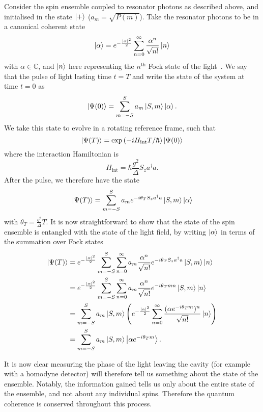 Consider the spin ensemble coupled to resonator photons as described above, and
initialised in the state $\ket{+}$ ($a_m = \sqrt{P(m)}$). Take the resonator
photons to be in a canonical coherent state~\cite{Gazeau2009}
%
\begin{equation}
  \ket{\alpha} = e^{-\frac{|\alpha|^2}{2}}\sum_{n=0}^\infty \frac{\alpha^n}{\sqrt{n!}} \ket{n}
\end{equation}
%
with $\alpha\in\mathbb{C}$, and $\ket{n}$ here representing the $n^\text{th}$
Fock state of the light~\cite{agarwal2012}. We say that the pulse of light lasting time
$t=T$ and  write the state of the system at time $t=0$ as
%
\begin{equation}
  \ket{\Psi(0)} = \sum_{m=-S}^S a_m \ket{S, m}\ket{\alpha}.
\end{equation}
%
We take this state to evolve in a rotating reference frame, such that
%
\begin{equation}
  \ket{\Psi(T)} = \exp\left(-iH_\text{int}T/\hbar\right)\ket{\Psi(0)}
\end{equation}
%
where the interaction Hamiltonian is
%
\begin{equation}
  H_\text{int} = \hbar \frac{g^2}{\Delta} S_z a^\dagger a.
\end{equation}
%
After the pulse, we therefore have the state
%
\begin{equation}
  \ket{\Psi(T)} = \sum_{m=-S}^S a_m e^{-i\theta_T S_z
  a^\dagger a} \ket{S, m}\ket{\alpha}
\end{equation}
%
with $\theta_T = \frac{g^2}{\Delta} T$. It is now straightforward to show that
the state of the spin ensemble is entangled with the state of the light field,
by writing $\ket{\alpha}$ in terms of the summation over Fock states
%
\begin{align}
  \ket{\Psi(T)} &= e^{-\frac{|\alpha|^2}{2}}\sum_{m=-S}^S \sum_{n=0}^\infty a_m
   \frac{\alpha^n}{\sqrt{n!}} e^{-i\theta_T S_z a^\dagger a} \ket{S, m} \ket{n}
   \\
  &= e^{-\frac{|\alpha|^2}{2}}\sum_{m=-S}^S \sum_{n=0}^\infty a_m
  \frac{\alpha^n}{\sqrt{n!}} e^{-i\theta_T m n} \ket{S, m} \ket{n} \\
  &= \sum_{m=-S}^S a_m \ket{S, m} \left( e^{-\frac{|\alpha|^2}{2}}
  \sum_{n=0}^\infty \frac{(\alpha e^{-i\theta_T m})^n}{\sqrt{n!}}\ket{n}\right)
  \\
  &= \sum_{m=-S}^S a_m \ket{S, m}\ket{\alpha e^{-i\theta_T m}}.
\end{align}

It is now clear measuring the phase of the light leaving the cavity
(for example with a homodyne detector) will therefore tell us something about
the state of the ensemble. Notably, the information gained tells us only about
the entire state of the ensemble, and not about any individual spins. Therefore
the quantum coherence is conserved throughout this process.

